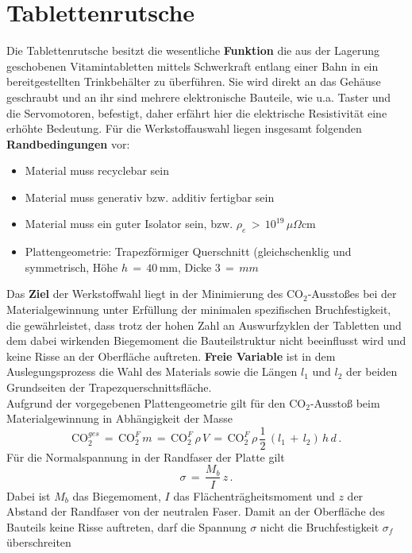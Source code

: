 \section{Tablettenrutsche}
Die Tablettenrutsche besitzt die wesentliche \textbf{Funktion} die aus der Lagerung geschobenen Vitamintabletten mittels Schwerkraft entlang einer Bahn in ein bereitgestellten Trinkbehälter zu überführen. Sie wird direkt an das Gehäuse geschraubt und an ihr sind mehrere elektronische Bauteile, wie u.a. Taster und die Servomotoren, befestigt, daher erfährt hier die elektrische Resistivität eine erhöhte Bedeutung. Für die Werkstoffauswahl liegen insgesamt folgenden \textbf{Randbedingungen} vor:
\begin{itemize}
	\item Material muss recyclebar sein
	\item Material muss generativ bzw. additiv fertigbar sein
	\item Material muss ein guter Isolator sein, bzw. $\rho_e\,>\,10^{19}\,\mu\Omega$cm
	\item Plattengeometrie: Trapezförmiger Querschnitt (gleichschenklig und symmetrisch, Höhe $h\,=\,40\,$mm, Dicke $3\,=\,mm$
\end{itemize}
Das \textbf{Ziel} der Werkstoffwahl liegt in der Minimierung des CO$_2$-Ausstoßes bei der Materialgewinnung unter Erfüllung der minimalen spezifischen Bruchfestigkeit, die gewährleistet, dass trotz der hohen Zahl an Auswurfzyklen der Tabletten und dem dabei wirkenden Biegemoment die Bauteilstruktur nicht beeinflusst wird und keine Risse an der Oberfläche auftreten. \textbf{Freie Variable} ist in dem Auslegungsprozess die Wahl des Materials sowie die Längen $l_1$ und $l_2$ der beiden Grundseiten der Trapezquerschnittsfläche.\\
Aufgrund der vorgegebenen Plattengeometrie gilt für den CO$_2$-Ausstoß beim Materialgewinnung in Abhängigkeit der Masse
\begin{equation}\label{masse32}
\text{CO}_2^{ges}\,=\,\text{CO}_2^F\,m\,=\,\text{CO}_2^F\,\rho\,V\,=\,\text{CO}_2^F\,\rho\,\frac{1}{2}\,(l_1\,+\,l_2)\,h\,d\,.
\end{equation}
Für die Normalspannung in der Randfaser der Platte gilt
\begin{equation}
\sigma\,=\,\frac{M_b}{I}\,z\,.
\end{equation}
Dabei ist $M_b$ das Biegemoment, $I$ das Flächenträgheitsmoment und $z$ der Abstand der Randfaser von der neutralen Faser. Damit an der Oberfläche des Bauteils keine Risse auftreten, darf die Spannung $\sigma$ nicht die Bruchfestigkeit $\sigma_f$ überschreiten
